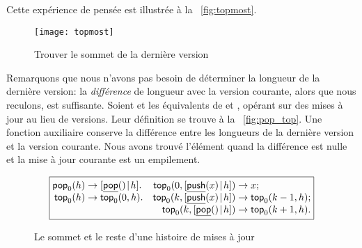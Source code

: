 Cette expérience de pensée est illustrée à la
\fig~\vref{fig:topmost}.
\begin{figure}
\centering
\texttt{[image: topmost]}
\caption{Trouver le sommet de la dernière version}
\label{fig:topmost}
\end{figure}
Remarquons que nous n'avons pas besoin de déterminer la longueur de la
dernière version: la \emph{différence} de longueur avec la version courante, alors que nous reculons, est suffisante. Soient
 et
 les équivalents de
 et , opérant sur des mises à jour au lieu de versions. Leur définition se trouve à la \fig~\vref{fig:pop_top}.
Une fonction auxiliaire
 conserve la différence
entre les longueurs de la dernière version et la version
courante. Nous avons trouvé l'élément quand la différence est nulle et
la mise à jour courante est un empilement.

\begin{center}
\begin{figure}[h]
\begin{equation*}
\boxed{%
\begin{array}{@{}r@{\;}l@{\;}lr@{\;}l@{\;}l@{}}
\fun{pop}_0(h)   & \rightarrow          & \cons{\ufun{pop}()}{h}. &
\fun{top}_0(0,\cons{\ufun{push}(x)}{h}) & \rightarrow             & x;\\
\fun{top}_0(h)   & \rightarrow          & \fun{top}_0(0,h).       &
\fun{top}_0(k,\cons{\ufun{push}(x)}{h}) & \rightarrow             & \fun{top}_0(k-1,h);\\
                 & & &
\fun{top}_0(k,\cons{\ufun{pop}()}{h})   & \rightarrow            & \fun{top}_0(k+1,h).
\end{array}}
\end{equation*}
\caption{Le sommet et le reste d'une histoire de mises à jour}
\label{fig:pop_top}
\end{figure}
\end{center}

